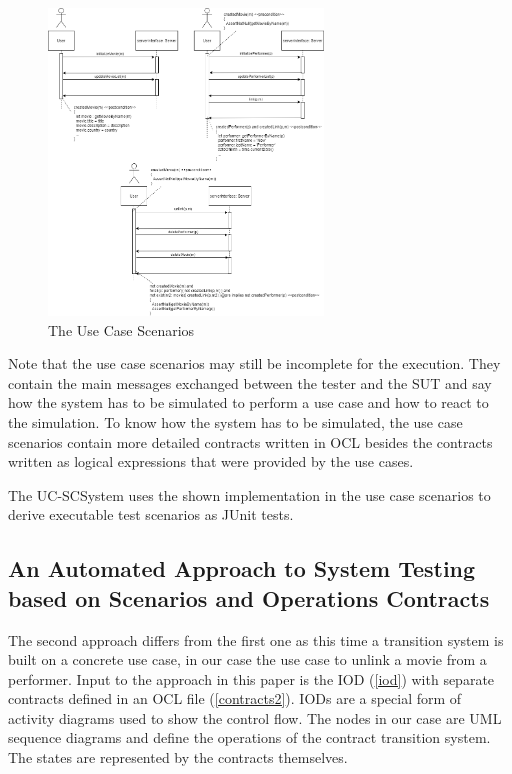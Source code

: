\begin{figure}[h]
	\centering
	\includegraphics[width=0.65\textwidth]{img/ucs.png}
	\caption{The Use Case Scenarios}
	\label{ucs}
\end{figure}

Note that the use case scenarios may still be incomplete for the execution. They contain the main messages exchanged between the tester and the SUT and say how the system has to be simulated to perform a use case and how to react to the simulation. To know how the system has to be simulated, the use case scenarios contain more detailed contracts written in OCL besides the contracts written as logical expressions that were provided by the use cases. 

The UC-SCSystem uses the shown implementation in the use case scenarios to derive executable test scenarios as JUnit tests. 

\subsection{An Automated Approach to System Testing based on Scenarios and Operations Contracts}

The second approach differs from the first one as this time a transition system is built on a concrete use case, in our case the use case to unlink a movie from a performer. Input to the approach in this paper is the IOD (\autoref{iod}) with separate contracts defined in an OCL file (\autoref{contracts2}). IODs are a special form of activity diagrams used to show the control flow. The nodes in our case are UML sequence diagrams and define the operations of the contract transition system. The states are represented by the contracts themselves. 

